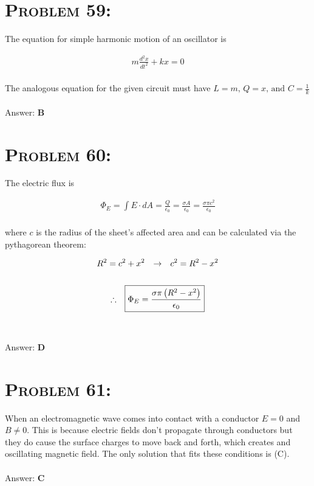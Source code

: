 \documentclass{article}
\begin{document}

\section{\textsc{Problem 59:}} The equation for simple harmonic motion of an oscillator is

\begin{gather}
m \frac{d^{2}x}{dt^{2}} + kx = 0
\end{gather}
\\
The analogous equation for the given circuit must have $\boxed{L = m\text{, }Q = x\text{, and }C = \frac{1}{k}}$
\\\\
Answer: \textbf{\textcolor{ProcessBlue}B}\\


\section{\textsc{Problem 60:}} The electric flux is

\begin{gather}
\Phi_{E} = \int{E \cdot dA} = \frac{Q}{\epsilon_{0}} = \frac{\sigma A}{\epsilon_{0}} = \frac{\sigma \pi c^{2}}{\epsilon_{0}}
\end{gather}
\\
where $c$ is the radius of the sheet's affected area and can be calculated via the pythagorean theorem:

\begin{gather}
R^{2} = c^{2} + x^{2} \hspace{.1in} \rightarrow \hspace{.1in} c^{2} = R^{2} - x^{2}\nonumber\\
\nonumber\\
\therefore \hspace{.1in} \boxed{\Phi_{E} = \frac{\sigma \pi \left(   R^{2} - x^{2}  \right)}{\epsilon_{0}}}\nonumber
\end{gather}
\\\\
Answer: \textbf{\textcolor{ProcessBlue}D}\\


\section{\textsc{Problem 61:}} When an electromagnetic wave comes into contact with a conductor $E = 0$ and $B \neq 0$. This is because electric fields don't propagate through conductors but they do cause the surface charges to move back and forth, which creates and oscillating magnetic field. The only solution that fits these conditions is (C).
\\\\
Answer: \textbf{\textcolor{ProcessBlue}C}\\
\end{document}
